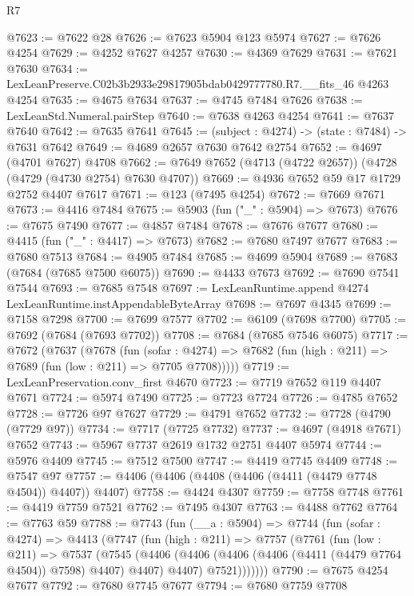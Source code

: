 \begin{lexlean}{R7}
\begin{coremodule}
@7623 := @7622 @28
@7626 := @7623 @5904 @123 @5974
@7627 := @7626 @4254
@7629 := @4252 @7627 @4257
@7630 := @4369 @7629
@7631 := @7621 @7630
@7634 := LexLeanPreserve.C02b3b2933e29817905bdab0429777780.R7.__fits_46 @4263 @4254
@7635 := @4675 @7634
@7637 := @4745 @7484 @7626
@7638 := LexLeanStd.Numeral.pairStep
@7640 := @7638 @4263 @4254
@7641 := @7637 @7640
@7642 := @7635 @7641
@7645 := (subject : @4274) -> (state : @7484) -> @7631 @7642
@7649 := @4689 @2657 @7630 @7642 @2754
@7652 := @4697 (@4701 @7627) @4708
@7662 := @7649 @7652 (@4713 (@4722 @2657)) (@4728 (@4729 (@4730 @2754) @7630 @4707))
@7669 := @4936 @7652 @59 @17 @1729 @2752 @4407 @7617
@7671 := @123 (@7495 @4254)
@7672 := @7669 @7671
@7673 := @4416 @7484
@7675 := @5903 (fun ("_" : @5904) => @7673)
@7676 := @7675 @7490
@7677 := @4857 @7484
@7678 := @7676 @7677
@7680 := @4415 (fun ("_" : @4417) => @7673)
@7682 := @7680 @7497 @7677
@7683 := @7680 @7513
@7684 := @4905 @7484
@7685 := @4699 @5904
@7689 := @7683 (@7684 (@7685 @7500 @6075))
@7690 := @4433 @7673
@7692 := @7690 @7541 @7544
@7693 := @7685 @7548
@7697 := LexLeanRuntime.append @4274 LexLeanRuntime.instAppendableByteArray
@7698 := @7697 @4345
@7699 := @7158 @7298
@7700 := @7699 @7577
@7702 := @6109 (@7698 @7700)
@7705 := @7692 (@7684 (@7693 @7702))
@7708 := @7684 (@7685 @7546 @6075)
@7717 := @7672
    (@7637
      (@7678
        (fun (sofar : @4274) =>
        @7682 (fun (high : @211) => @7689 (fun (low : @211) => @7705 @7708)))))
@7719 := LexLeanPreservation.conv_first @4670
@7723 := @7719 @7652 @119 @4407 @7671
@7724 := @5974 @7490
@7725 := @7723 @7724
@7726 := @4785 @7652
@7728 := @7726 @97 @7627
@7729 := @4791 @7652
@7732 := @7728 (@4790 (@7729 @97))
@7734 := @7717 (@7725 @7732)
@7737 := @4697 (@4918 @7671) @7652
@7743 := @5967 @7737 @2619 @1732 @2751 @4407 @5974
@7744 := @5976 @4409
@7745 := @7512 @7500
@7747 := @4419 @7745 @4409
@7748 := @7547 @97
@7757 := @4406 (@4406 (@4408 (@4406 (@4411 (@4479 @7748 @4504)) @4407)) @4407)
@7758 := @4424 @4307
@7759 := @7758 @7748
@7761 := @4419 @7759 @7521
@7762 := @7495 @4307
@7763 := @4488 @7762
@7764 := @7763 @59
@7788 := @7743
    (fun (__a : @5904) =>
    @7744
      (fun (sofar : @4274) =>
      @4413
        (@7747
          (fun (high : @211) =>
          @7757
            (@7761
              (fun (low : @211) =>
              @7537
                (@7545
                  (@4406
                    (@4406 (@4406 (@4406 (@4411 (@4479 @7764 @4504)) @7598) @4407) @4407)
                    @4407)
                  @7521)))))))
@7790 := @7675 @4254 @7677
@7792 := @7680 @7745 @7677
@7794 := @7680 @7759 @7708

\end{coremodule}
\end{lexlean}
